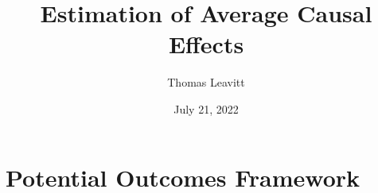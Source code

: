 \documentclass[table, xcolor = {dvipsnames}, 9pt]{beamer}
\title[]{Estimation of Average Causal Effects} %
\author{Thomas Leavitt} %
\institute[] %
{
\medskip
\textit{} %
}
\date{July 21, 2022} %
\theoremstyle{plain}
\begin{document}
\begin{frame}
\titlepage %
\end{frame}


\section{Potential Outcomes Framework}
\end{document}
